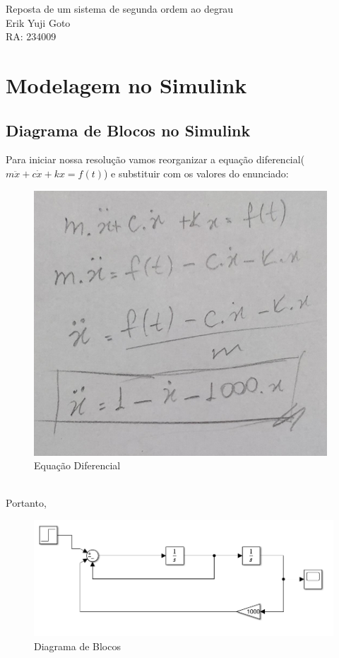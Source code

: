 \documentclass[a4paper, 12pt]{article}
\begin{document}
	\begin{center} %
		{\Large Reposta de um sistema de segunda ordem ao degrau}\\[0.4cm]
		{\large Erik Yuji Goto}\\[0.2cm]
		{\normalsize RA: 234009}
	\end{center} %

\section{Modelagem no Simulink}
\subsection{Diagrama de Blocos no Simulink}
Para iniciar nossa resolução vamos reorganizar a equação diferencial($m\ddot{x} + c\dot{x} + kx = f(t)$) e substituir com os valores do enunciado:
\begin{figure}[h]
		\center
		\includegraphics[scale=0.6]{Imagens/aa.png}
		\caption{Equação Diferencial}
	\end{figure}
	\\
Portanto,
\begin{figure}[h]
		\center
		\includegraphics[scale=0.6]{Imagens/aaa.png}
		\caption{Diagrama de Blocos}
	\end{figure}
\end{document}

